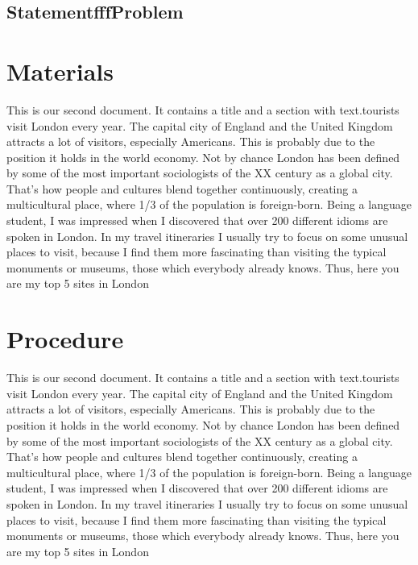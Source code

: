 \documentclass[a4paper,twoside]{report}
\begin{document}
\subsection{StatementfffProblem}
\zhlipsum[2-9]
\newpage
\section{Materials}
This is our second document. It contains a title and a 
section with text.tourists visit London every year. The capital city of England and the United Kingdom attracts a lot of visitors, especially Americans. This is probably due to the position it holds in the world economy.
Not by chance London has been defined by some of the most important sociologists of the XX century as a global city. That’s how people and cultures blend together continuously, creating a multicultural place, where 1/3 of the population is foreign-born. Being a language student, I was impressed when I discovered that over 200 different idioms are spoken in London.
In my travel itineraries I usually try to focus on some unusual places to visit, because I find them more fascinating than visiting the typical monuments or museums, those which everybody already knows. Thus, here you are my top 5 sites in London

\newpage
\section{Procedure}
This is our second document. It contains a title and a 
section with text.tourists visit London every year. The capital city of England and the United Kingdom attracts a lot of visitors, especially Americans. This is probably due to the position it holds in the world economy.
Not by chance London has been defined by some of the most important sociologists of the XX century as a global city. That’s how people and cultures blend together continuously, creating a multicultural place, where 1/3 of the population is foreign-born. Being a language student, I was impressed when I discovered that over 200 different idioms are spoken in London.
In my travel itineraries I usually try to focus on some unusual places to visit, because I find them more fascinating than visiting the typical monuments or museums, those which everybody already knows. Thus, here you are my top 5 sites in London
\newpage
\end{document}
